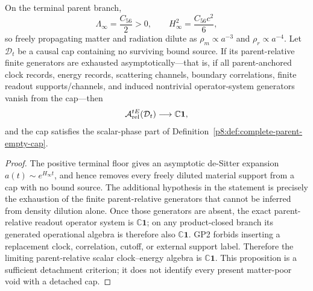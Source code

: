 \documentclass[12pt,a4paper]{article}
\begin{document}
\begin{proposition}
\label{p8:thm:late-de-sitter-phase-exhaustion}
On the terminal parent branch,
\begin{equation}
\label{p8:eq:positive-terminal-floor-for-exhaustion}
    \Lambda_\infty=\frac{C_{56}}2>0,
    \qquad
    H_\infty^2=\frac{C_{56}c^2}{6},
\end{equation}
so freely propagating matter and radiation dilute as
\(\rho_m\propto a^{-3}\) and \(\rho_r\propto a^{-4}\).  Let
\(\mathcal D_t\) be a causal cap containing no surviving bound source.  If its
parent-relative finite generators are exhausted asymptotically---that is, if
all parent-anchored clock records, energy records, scattering channels,
boundary correlations, finite readout supports/channels, and induced nontrivial
operator-system generators vanish from the cap---then
\begin{equation}
\label{p8:eq:late-de-sitter-algebra-collapse}
    \mathcal A^{tE}_{\rm rel}(\mathcal D_t)
    \longrightarrow
    \mathbb C\mathbf 1,
\end{equation}
and the cap satisfies the scalar-phase part of
Definition~\ref{p8:def:complete-parent-empty-cap}.
\end{proposition}

\begin{proof}
The positive terminal floor gives an asymptotic de-Sitter expansion
\(a(t)\sim e^{H_\infty t}\), and hence removes every freely diluted material
support from a cap with no bound source.  The additional hypothesis in the
statement is precisely the exhaustion of the finite parent-relative generators
that cannot be inferred from density dilution alone.  Once those generators are
absent, the exact parent-relative readout operator system is \(\mathbb C\mathbf1\);
on any product-closed branch its generated operational algebra is therefore
also \(\mathbb C\mathbf1\).  GP2
forbids inserting a replacement clock, correlation, cutoff, or external support
label.  Therefore the limiting parent-relative scalar clock--energy algebra is
\(\mathbb C\mathbf1\).  This proposition is a sufficient detachment criterion;
it does not identify every present matter-poor void with a detached cap.
\end{proof}
\end{document}
